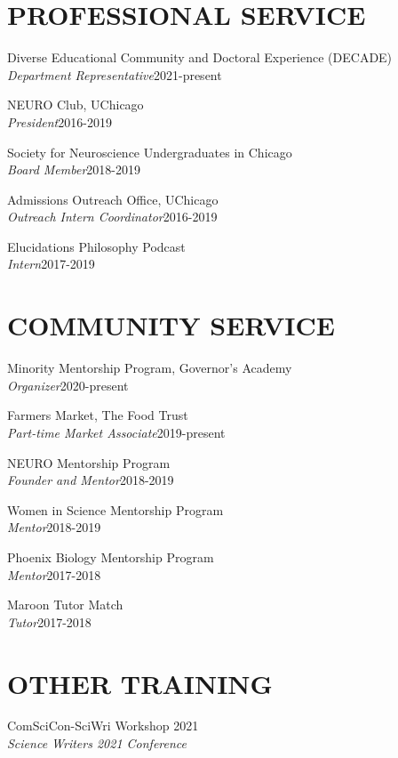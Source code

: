\documentclass[margin, 10pt]{res} %
\begin{document}
\begin{resume}
\section{PROFESSIONAL SERVICE}

{Diverse Educational Community and Doctoral Experience (DECADE)} \\
{\sl Department Representative}\hfill 2021-present

{NEURO Club, UChicago} \\
{\sl President}\hfill{2016-2019}

{Society for Neuroscience Undergraduates in Chicago} \\
{\sl Board Member}\hfill{2018-2019}

{Admissions Outreach Office, UChicago} \\
{\sl Outreach Intern Coordinator}\hfill{2016-2019}

{Elucidations Philosophy Podcast} \\
{\sl Intern}\hfill{2017-2019}


\section{COMMUNITY SERVICE}


{Minority Mentorship Program, Governor's Academy} \\
{\sl Organizer}\hfill 2020-present

{Farmers Market, The Food Trust} \\
{\sl Part-time Market Associate}\hfill 2019-present

{NEURO Mentorship Program} \\
{\sl Founder and Mentor}\hfill{2018-2019}

{Women in Science Mentorship Program} \\
{\sl Mentor}\hfill{2018-2019}

{Phoenix Biology Mentorship Program} \\
{\sl Mentor}\hfill{2017-2018}

{Maroon Tutor Match} \\
{\sl Tutor}\hfill{2017-2018}




\section{OTHER TRAINING} 
ComSciCon-SciWri Workshop \hfill 2021 \\
{\sl  Science Writers 2021 Conference}


\end{resume}
\end{document}
